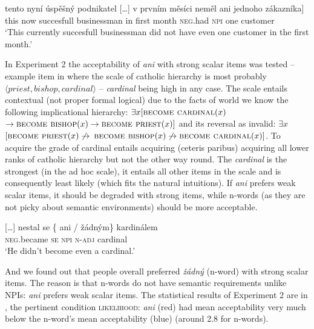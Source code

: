 \documentclass[output=paper, colorlinks, citecolor=brown, newtxmath]{langsci/langscibook}
\begin{document}
\ea\label{ex-41} \gll tento nyní úspěšný podnikatel {[}\ldots{}{]} v prvním měsíci neměl \minsp{[} ani jednoho zákazníka]\\
this now succesfull businessman {} in first month \textsc{neg}.had {} \textsc{npi} one customer {}\\
\glt `This currently succesfull businessman did not have even one customer in the first month.'
\z

\noindent\sloppy In Experiment 2 the acceptability of \textit{ani} with strong scalar items was tested -- example item in  where the scale of catholic hierarchy is most probably $\langle priest, bishop, cardinal\rangle$ -- \textit{cardinal} being high  in any case. The scale entails contextual (not proper formal logical)  due to the facts of world we know the following implicational hierarchy: $\exists x[\textsc{become cardinal}(x)$ $\rightarrow \textsc{become bishop}(x) \rightarrow \textsc{become priest}(x)]$ and its reversal as invalid: $\exists x$ $[\textsc{become priest}(x) \not\rightarrow$ $\textsc{become bishop}(x) \not\rightarrow \textsc{become cardinal}(x)]$. To acquire the grade of cardinal entails acquiring (ceteris paribus) acquiring all lower ranks of catholic hierarchy but not the other way round. The  \textit{cardinal} is the strongest (in the ad hoc scale), it entails all other items in the scale and is consequently least likely (which fits the natural intuitions). If \textit{ani} prefers weak scalar items, it should be degraded with strong items, while n-words (as they are not picky about semantic environments) should be more acceptable.

\ea \label{ex-42} {[{\ldots{}}]} \gll nestal se \{\hspace{-2pt} ani / žádným\} kardinálem\\
\textsc{neg.}became \textsc{se} {} \textsc{npi} {} \textsc{n-adj} cardinal\\
\glt `He didn't become even a cardinal.'
\z

\noindent And we found out that people overall preferred \textit{žádný} (n-word) with strong scalar items. The reason is that n-words do not have semantic requirements unlike NPIs: \textit{ani} prefers weak scalar items. The statistical results of Experiment 2 are in  , the pertinent condition \textsc{likelihood}: \textit{ani} (red) had mean acceptability very much below the n-word's mean acceptability (blue) (around 2.8 for n-words).
\end{document}
